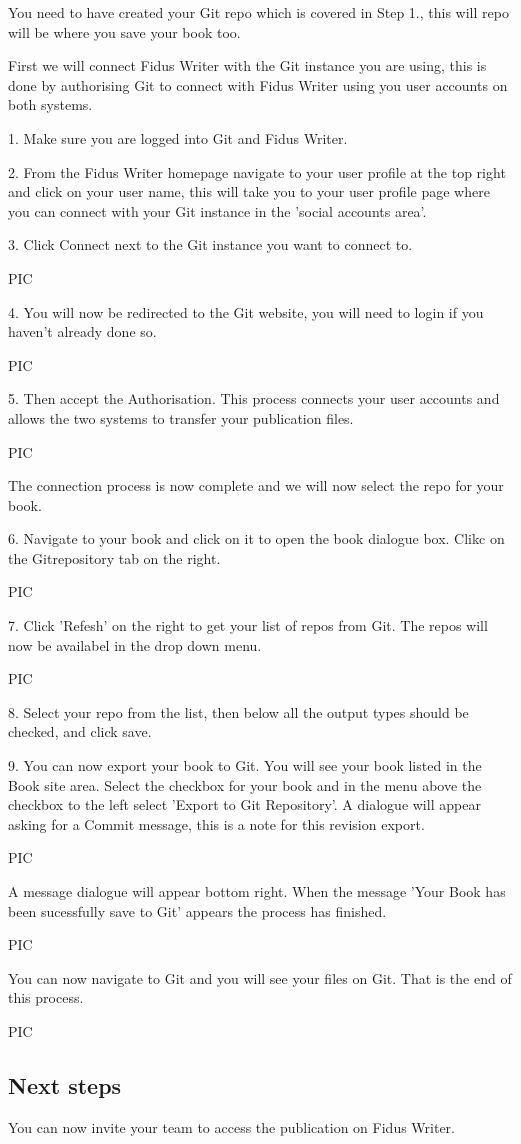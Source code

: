 \documentclass{article}
\begin{document}
You need to have created your Git repo which is covered in Step 1., this will repo will be where you save your book too.


First we will connect Fidus Writer with the Git instance you are using, this is done by authorising Git to connect with Fidus Writer using you user accounts on both systems.


1. Make sure you are logged into Git and Fidus Writer.


2. From the Fidus Writer homepage navigate to your user profile at the top right and click on your user name, this will take you to your user profile page where you can connect with your Git instance in the 'social accounts area'.


3. Click Connect next to the Git instance you want to connect to.


PIC


4. You will now be redirected to the Git website, you will need to login if you haven't already done so.


PIC


5. Then accept the Authorisation. This process connects your user accounts and allows the two systems to transfer your publication files.


PIC


The connection process is now complete and we will now select the repo for your book.


6. Navigate to your book and click on it to open the book dialogue box. Clikc on the Gitrepository tab on the right.


PIC


7. Click 'Refesh' on the right to get your list of repos from Git. The repos will now be availabel in the drop down menu.


PIC


8. Select your repo from the list, then below all the output types should be checked, and click save.


9. You can now export your book to Git. You will see your book listed in the Book site area. Select the checkbox for your book and in the menu above the checkbox to the left select 'Export to Git Repository'. A dialogue will appear asking for a Commit message, this is a note for this revision export.


PIC


A message dialogue will appear bottom right. When the message 'Your Book has been sucessfully save to Git' appears the process has finished. 


PIC


You can now navigate to Git and you will see your files on Git. That is the end of this process.


PIC


\subsection{Next steps}\label{H6619707}



You can now invite your team to access the publication on Fidus Writer.
\end{document}
